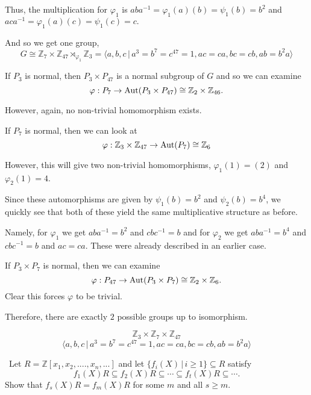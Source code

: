 \documentclass[12pt]{AlgebraQual}
\begin{document}
\begin{solution}
Thus, the multiplication for $\varphi_1$ is $a ba^{-1}=\varphi_1(a)(b)=\psi_1(b)=b^2$ and $aca^{-1}=\varphi_1(a)(c)=\psi_1(c)=c.$

And so we get one group, $$G\cong\mathbb{Z}_7\times\mathbb{Z}_{47}\rtimes_{\varphi_1}\mathbb{Z}_3=\langle a,b,c\,|\,a^3=b^7=c^{47}=1,ac=ca,bc=cb,ab=b^2a\rangle$$

 If $P_3$ is normal, then $P_3\times P_{47}$ is a normal subgroup of $G$ and so we can examine $$\varphi:P_7\to\text{Aut}(P_3\times P_{47})\cong\mathbb{Z}_2\times\mathbb{Z}_{46}.$$

However, again, no non-trivial homomorphism exists.

 If $P_7$ is normal, then we can look at $$\varphi:\mathbb{Z}_3\times\mathbb{Z}_{47}\to\text{Aut}(P_7)\cong\mathbb{Z}_6$$

However, this will give two non-trivial homomorphisms, $\varphi_1(1)=(2)$ and $\varphi_2(1)=4$.

Since these automorphisms are given by $\psi_1(b)=b^2$ and $\psi_2(b)=b^4$, we quickly see that both of these yield the same multiplicative structure as before.

Namely, for $\varphi_1$ we get $aba^{-1}=b^2$ and $cbc^{-1}=b$ and for $\varphi_2$ we get $aba^{-1}=b^4$ and $cbc^{-1}=b$ and $ac=ca$. These were already described in an earlier case.


 If $P_3\times P_7$ is normal, then we can examine $$\varphi:P_{47}\to\text{Aut}(P_3\times P_7)\cong\mathbb{Z}_2\times\mathbb{Z}_6.$$ Clear this forces $\varphi$ to be trivial.

Therefore, there are exactly $2$ possible groups up to isomorphism.

\begin{center}
    \begin{framed}
    \vspace{-0.25cm}
    $$\mathbb{Z}_3\times\mathbb{Z}_7\times\mathbb{Z}_{47}$$
    \vspace{-0.5cm}
    $$\langle a,b,c\,|\,a^3=b^7=c^{47}=1,ac=ca,bc=cb,ab=b^2a\rangle$$
    \end{framed}
\end{center}\qedhere
\end{solution}
\newpage



\begin{problem} $\,$
Let $R=\mathbb{Z}[x_1,x_2,....,x_n,...]$ and let $\{f_i(X)\,|\,i\ge 1\}\subseteq R$ satisfy $$f_1(X)R\subseteq f_2(X)R\subseteq\cdots\subseteq f_t(X)R\subseteq\cdots.$$ Show that $f_s(X)R=f_m(X)R$ for some $m$ and all $s\ge m.$
\end{problem}
\end{document}
